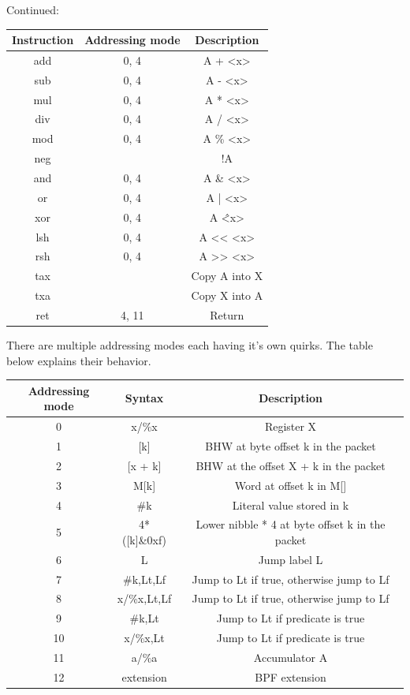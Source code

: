 \newpage
\noindent
Continued:
\begin{center}
 \begin{tabular}{||c c c||} 
 \hline
 Instruction & Addressing mode & Description \\ [0.5ex] 
 \hline\hline
  add & 0, 4 & A + <x> \\
  \hline
  sub & 0, 4 & A - <x> \\
  \hline
  mul & 0, 4 & A * <x> \\
  \hline
  div & 0, 4 & A / <x> \\
  \hline
  mod & 0, 4 & A \% <x> \\
  \hline
  neg & & !A \\
  \hline
  and & 0, 4 & A \& <x> \\
  \hline
  or & 0, 4 & A | <x> \\
  \hline
  xor & 0, 4 & A \^ <x> \\
  \hline
  lsh &  0, 4 & A << <x> \\
  \hline
  rsh & 0, 4 & A >> <x> \\
  \hline
  tax & & Copy A into X \\
  \hline
  txa & & Copy X into A \\
  \hline
  \hline
  ret & 4, 11 & Return \\
  \hline
\end{tabular}
\end{center}

\newpage
There are multiple addressing modes each having it's own quirks. The table below explains their behavior.
\begin{center}
 \begin{tabular}{||c c c||} 
 \hline
   Addressing mode & Syntax & Description  \\ [0.5ex] 
 \hline\hline
   0 & x/\%x & Register X \\
   \hline
   1 & [k] & BHW at byte offset k in the packet \\
   \hline
   2 & [x + k] & BHW at the offset X + k in the packet \\
   \hline
   3 & M[k] & Word at offset k in M[] \\
   \hline
   4 & \#k & Literal value stored in k \\
   \hline
   5 & 4*([k]\&0xf) & Lower nibble * 4 at byte offset k in the packet \\
   \hline
   6 & L & Jump label L \\
   \hline
   7 & \#k,Lt,Lf & Jump to Lt if true, otherwise jump to Lf \\
   \hline
   8 & x/\%x,Lt,Lf & Jump to Lt if true, otherwise jump to Lf \\
   \hline
   9 & \#k,Lt & Jump to Lt if predicate is true \\
   \hline
  10 & x/\%x,Lt & Jump to Lt if predicate is true \\
   \hline
  11 & a/\%a & Accumulator A \\
   \hline
  12 & extension & BPF extension \\
   \hline
\end{tabular}
\end{center}

